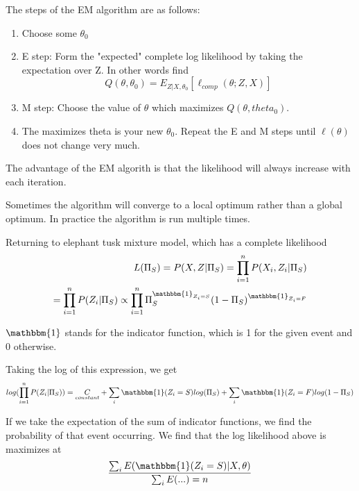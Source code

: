 \documentclass[10pt,a4paper]{article}
\begin{document}
The steps of the EM algorithm are as follows:
\begin{enumerate}

\item Choose some $\theta_0$

\item E step: Form the "expected" complete log likelihood by taking the expectation over Z. In other words find \begin{equation}
Q(\theta,\theta_0) = E_{Z|X,\theta_0}[\ell_{comp}(\theta;Z,X)]
\end{equation}

\item M step: Choose the value of $\theta$ which maximizes $Q(\theta,theta_0)$.

\item The maximizes theta is your new $\theta_0$. Repeat the E and M steps until $\ell(\theta)$ does not change very much.
\end{enumerate}

The advantage of the EM algorith is that the likelihood will always increase with each iteration.

Sometimes the algorithm will converge to a local optimum rather than a global optimum. In practice the algorithm is run multiple times.

Returning to elephant tusk mixture model, which has a complete likelihood \begin{equation}
\begin{aligned}
L(\Pi_S) = P(X,Z|\Pi_S) = \prod_{i=1}^{n}P(X_i,Z_i|\Pi_S) \\
 = \prod_{i=1}^{n}P(Z_i|\Pi_S)
 \propto \prod_{i=1}^{n}\Pi_S^{\mathbbm{1}_{Z_i=S}}(1-\Pi_S)^{\mathbbm{1}_{Z_i=F}}
\end{aligned}
\end{equation}

$\mathbbm{1}$ stands for the indicator function, which is 1 for the given event and 0 otherwise.

Taking the log of this expression, we get
\begin{equation}
log(\prod_{i=1}^{n}P(Z_i|\Pi_S)) = \underset{ constant}{C} + \sum_i \mathbbm{1}(Z_i=S)log(\Pi_S) + \sum_i \mathbbm{1}(Z_i=F)log(1-\Pi_S)
\end{equation}

If we take the expectation of the sum of indicator functions, we find the probability of that event occurring. We find that the log likelihood above is maximizes at
\begin{equation}
\frac{\sum_i E(\mathbbm{1}(Z_i=S)|X,\theta)}{\sum_i E(...) = n}
\end{equation}
\end{document}
